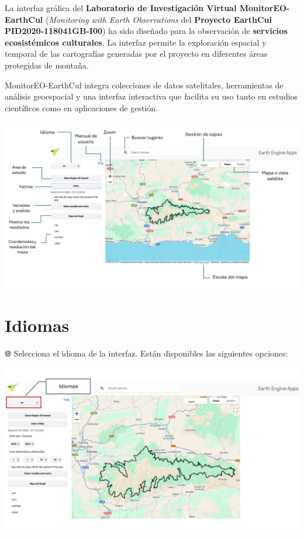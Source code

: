 \documentclass[
]{book}
\begin{document}
La interfaz gráfica del \textbf{Laboratorio de Investigación Virtual MonitorEO-EarthCul} (\emph{Monitoring with Earth Observations} del \textbf{Proyecto EarthCul PID2020-118041GB-I00}) ha sido diseñado para la observación de \textbf{servicios ecosistémicos culturales}. La interfaz permite la exploración espacial y temporal de las cartografías generadas por el proyecto en diferentes áreas protegidas de montaña.

MonitorEO-EarthCul integra colecciones de datos satelitales, herramientas de análisis geoespacial y una interfaz interactiva que facilita su uso tanto en estudios científicos como en aplicaciones de gestión.

\includegraphics{assets/InterfazMonitorEO_es.png}

\chapter{Idiomas}\label{idiomas}

🌐 Selecciona el idioma de la interfaz. Están disponibles las siguientes opciones:

\includegraphics{assets/Idiomas.png}
\end{document}
